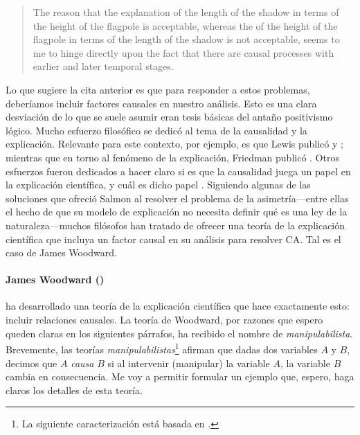 	\begin{quote}
    The reason that the explanation of the length of the
    shadow in terms of the height of the flagpole is
    acceptable, whereas the  of the height
    of the flagpole in terms of the length of the shadow is
    not acceptable, seems to me to hinge directly upon the
    fact that there are causal processes with earlier and
    later temporal stages. \parencite{Salmon1970}
	\end{quote}

Lo que sugiere la cita anterior es que para responder a
estos problemas, deberíamos incluir factores causales en
nuestro análisis. Esto es una clara desviación de lo que se
suele asumir eran tesis básicas del antaño positivismo
lógico. Mucho esfuerzo filosófico se dedicó al tema de la
causalidad y la explicación. Relevante para este contexto,
por ejemplo, es que Lewis publicó 
y ; mientras que en torno al
fenómeno de la explicación, Friedman publicó
. Otros esfuerzos fueron dedicados a
hacer claro si es que la causalidad juega un papel en la
explicación científica, y cuál es dicho papel
\parencite{Kitcher1962}. Siguiendo algunas de las
soluciones que ofreció Salmon al resolver el problema de la
asimetría---entre ellas el hecho de que su modelo de
explicación no necesita definir qué es una ley de la
naturaleza---muchos filósofos han tratado de ofrecer una
teoría de la explicación científica que incluya un factor
causal en su análisis para resolver CA. Tal es el caso de James Woodward.

\paragraph{James Woodward (\citeyear{Woodward2004})} 
ha desarrollado una teoría de la explicación científica que
hace exactamente esto: incluir relaciones causales. La
teoría de Woodward, por razones que espero queden claras en
los siguientes párrafos, ha recibido el nombre de
\emph{manipulabilista}. Brevemente, las teorías
\emph{manipulabilistas}\footnote{
  La siguiente  caracterización está basada en
  \parencite{sep-causation-mani,
             sep-causal-explanation-science, 
             Woodward2004,
             Woodward2000-WOOEAI}. 
}
afirman que dadas dos variables $ A $ y $ B $, decimos que $
A $ \emph{causa} $ B $ si al intervenir (manipular) la
variable $ A $, la variable $ B $ cambia en consecuencia. Me
voy a permitir formular un ejemplo que, espero, haga claros
los detalles de esta teoría.

